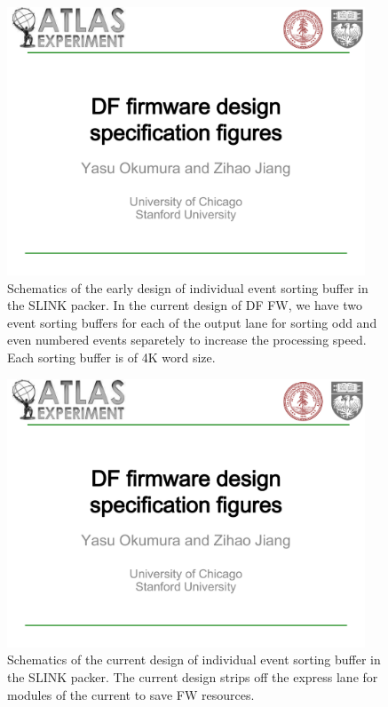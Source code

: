 \documentclass[11pt,letterpaper]{article}
\begin{document}
\begin{figure}[h!]
  \centering
  \includegraphics[width=0.95\textwidth,clip,page=11]{figures.pdf}
  \caption{Schematics of the early design of individual event sorting buffer in the SLINK packer. In the current design of DF FW, we have two event sorting buffers for each of the output lane for sorting odd and even numbered events separetely to increase the processing speed. Each sorting buffer is of 4K word size.}
  \label{fig:EVENT_SORTING_BUFFER_OLD}
\end{figure}

\begin{figure}[h!]
  \centering
  \includegraphics[width=0.95\textwidth,clip,page=12]{figures.pdf}
  \caption{Schematics of the current design of individual event sorting buffer in the SLINK packer. The current design strips off the express lane for modules of the current to save FW resources.}
  \label{fig:EVENT_SORTING_BUFFER_NEW}
\end{figure}
\end{document}
